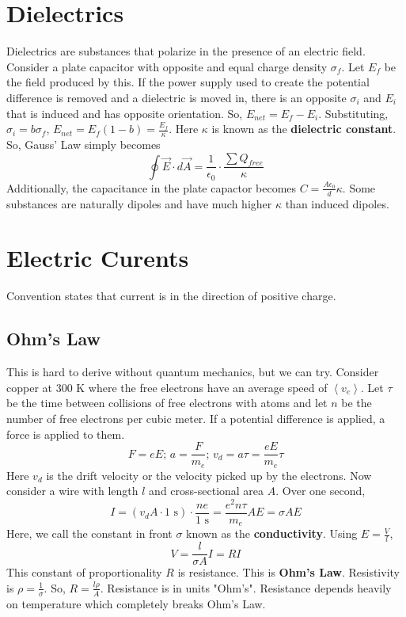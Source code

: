 \documentclass{article}
\newcommand{\expect}[1]{\left\langle #1 \right\rangle}
\begin{document}
\section{Dielectrics}
Dielectrics are substances that polarize in the presence of an electric field.
Consider a plate capacitor with opposite and equal charge density $\sigma_{f}$.
Let $E_{f}$ be the field produced by this. If the power supply used to create the potential 
difference is removed and a dielectric is moved in, there is an opposite $\sigma_{i}$
and $E_{i}$ that is induced and has opposite orientation. So, $E_{net}=E_{f}-E_{i}$.
Substituting, $\sigma_{i}=b\sigma_{f}$, $E_{net}=E_{f}(1-b)=\frac{E_{f}}{\kappa}$. Here $\kappa$
is known as the \textbf{dielectric constant}. So, Gauss' Law simply becomes
$$\oint \vec{E}\cdot d\vec{A}=\frac{1}{\epsilon_{0}}\cdot\frac{\sum Q_{free}}{\kappa}$$
Additionally, the capacitance in the plate capactor becomes $C=\frac{A\epsilon_{0}}{d}\kappa$.
Some substances are naturally dipoles and have much higher $\kappa$ than induced dipoles.

\section{Electric Curents}
Convention states that current is in the direction of positive charge.

\subsection{Ohm's Law}
This is hard to derive without quantum mechanics, but we can try.
Consider copper at 300 K where the free electrons have an average speed of $\expect{v_{e}}$.
Let $\tau$ be the time between collisions of free electrons with atoms and let $n$ be the number
of free electrons per cubic meter. If a potential difference is applied, a force is applied to them.
$$F=eE;\, a=\frac{F}{m_e};\, v_{d}=a\tau =\frac{eE}{m_{e}}\tau$$
Here $v_d$ is the drift velocity or the velocity picked up by the electrons.
Now consider a wire with length $l$ and cross-sectional area $A$. Over one second,
$$I=(v_{d}A\cdot 1\text{ s})\cdot \frac{ne}{1\text{ s}}=\frac{e^{2}n\tau}{m_{e}}AE=\sigma AE$$
Here, we call the constant in front $\sigma$ known as the \textbf{conductivity}. Using $E=\frac{V}{l}$,
$$V=\frac{l}{\sigma A}I=RI$$
This constant of proportionality $R$ is resistance. This is \textbf{Ohm's Law}.
Resistivity is $\rho=\frac{1}{\sigma}$. So, $R=\frac{l\rho}{A}$. Resistance is in units "Ohm's".
Resistance depends heavily on temperature which completely breaks Ohm's Law.
\end{document}
